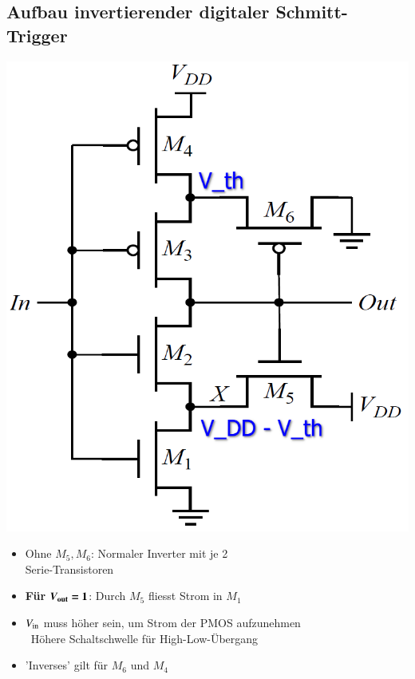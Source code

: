 \subsection{Aufbau invertierender digitaler Schmitt-Trigger}

\begin{minipage}[position]{0.3\columnwidth}
    \includegraphics[width=\columnwidth]{images/invertierender_schmitt-trigger.png}
\end{minipage}
\hfill
\begin{minipage}[position]{0.68\columnwidth}
    \begin{itemize}
        \item Ohne $M_5, M_6$: Normaler Inverter mit je 2\\
            Serie-Transistoren
        \item \textbf{Für }$\boldsymbol{V_{\rm out} = 1}$: Durch $M_5$ fliesst Strom in $M_1$
        \item $V_{\rm in}$ muss höher sein, um Strom der PMOS aufzunehmen\\
            \textrightarrow\ Höhere Schaltschwelle für High-Low-Übergang
        \item 'Inverses' gilt für $M_6$ und $M_4$
    \end{itemize}
\end{minipage}


